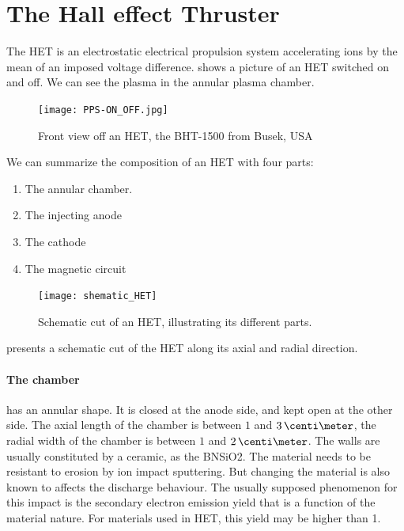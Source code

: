 

\section{The Hall effect Thruster }
\label{sec-HET}

The \ac{HET} is an electrostatic electrical propulsion system accelerating ions by the mean of an imposed voltage difference.
 shows a picture of an \ac{HET} switched on and off.
We can see the plasma in the annular plasma chamber.


\begin{figure}[hbtp]
  \centering
  \texttt{[image: PPS-ON\_OFF.jpg]}
  \caption{Front view off an \ac{HET}, the BHT-1500 from Busek, USA}
  \label{fig-bhtonoff}
\end{figure}

We can summarize the composition of an \ac{HET} with four parts\string:
\begin{enumerate}
  \item The annular chamber.
  \item The injecting anode
  \item The cathode
  \item The magnetic circuit
\end{enumerate}

\begin{figure}[hbtp]
  \centering
  \texttt{[image: shematic\_HET]}
  \caption{Schematic cut of an \ac{HET}, illustrating its different parts. }
  \label{fig-shematiccut}
\end{figure}

 presents a schematic cut of the \ac{HET} along its axial and radial direction.

\paragraph{The chamber} has an annular shape.
It is closed at the anode side, and kept open at the other side.
The axial length of the chamber is between $1$ and $3\,\centi\meter$, the radial width of the chamber is between $1$ and $2\,\centi\meter$. 
The walls are usually constituted by a ceramic, as the \ac{BNSiO2}.
The material needs to be resistant to erosion by ion impact sputtering.
But changing the material is also known to affects the discharge behaviour.
The usually supposed phenomenon for this impact is the secondary electron emission yield that is a function of the material nature.
For materials used in HET, this yield may be higher than 1.


